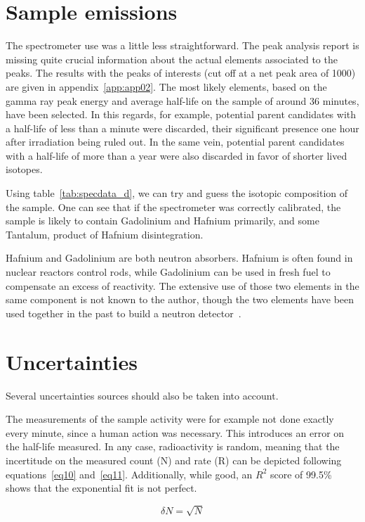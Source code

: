 \section{Sample emissions}

The spectrometer use was a little less straightforward. The peak analysis report is missing quite crucial information about the actual elements associated to the peaks. The results with the peaks of interests (cut off at a net peak area of 1000) are given in appendix~\ref{app:app02}. The most likely elements, based on the gamma ray peak energy and average half-life on the sample of around 36 minutes, have been selected. In this regards, for example, potential parent candidates with a half-life of less than a minute were discarded, their significant presence one hour after irradiation being ruled out. In the same vein, potential parent candidates with a half-life of more than a year were also discarded in favor of shorter lived isotopes.

Using table~\ref{tab:specdata_d}, we can try and guess the isotopic composition of the sample. One can see that if the spectrometer was correctly calibrated, the sample is likely to contain Gadolinium and Hafnium primarily, and some Tantalum, product of Hafnium disintegration.

Hafnium and Gadolinium are both neutron absorbers. Hafnium is often found in nuclear reactors control rods, while Gadolinium can be used in fresh fuel to compensate an excess of reactivity. The extensive use of those two elements in the same component is not known to the author, though the two elements have been used together in the past to build a neutron detector~\cite{imel95}.


\section{Uncertainties}

Several uncertainties sources should also be taken into account.

The measurements of the sample activity were for example not done exactly every minute, since a human action was necessary. This introduces an error on the half-life measured. In any case, radioactivity is random, meaning that the incertitude on the measured count (N) and rate (R) can be depicted following equations~\ref{eq10} and~\ref{eq11}. Additionally, while good, an $R^2$ score of 99.5\% shows that the exponential fit is not perfect.

\begin{equation}\label{eq10}
\delta N = \sqrt{N}
\end{equation}

